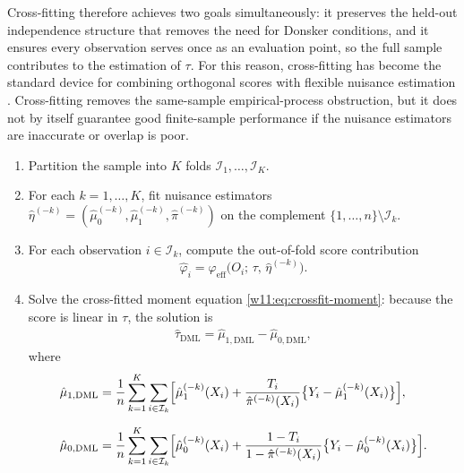 \documentclass[master.tex]{subfiles}
\begin{document}
Cross-fitting therefore achieves two goals simultaneously: it
preserves the held-out independence structure that removes the need
for Donsker conditions, and it ensures every observation serves
once as an evaluation point, so the full sample contributes to the
estimation of $\tau$.  For this reason, cross-fitting has become
the standard device for combining orthogonal scores with flexible
nuisance estimation \citep{chernozhukov2018double,vanderLaan2011targeted}.
Cross-fitting removes the same-sample empirical-process obstruction,
but it does not by itself guarantee good finite-sample performance
if the nuisance estimators are inaccurate or overlap is poor.

\begin{tcolorbox}[defstyle,
  title={Algorithm: Cross-Fitted Orthogonal-Score Estimator for the ATE}]
\label{w11:alg:crossfit}
\begin{enumerate}
  \item Partition the sample into $K$ folds
    $\mathcal{I}_1,\ldots,\mathcal{I}_K$.
  \item For each $k = 1,\ldots,K$, fit nuisance estimators
    $\hat\eta^{(-k)} = (\hat\mu_0^{(-k)}, \hat\mu_1^{(-k)},
    \hat\pi^{(-k)})$ on the complement
    $\{1,\ldots,n\} \setminus \mathcal{I}_k$.
  \item For each observation $i \in \mathcal{I}_k$, compute the
    out-of-fold score contribution
    \[
      \hat\varphi_i
      =
      \varphi_{\mathrm{eff}}\!\bigl(O_i;\,\tau,\,\hat\eta^{(-k)}\bigr).
    \]
  \item Solve the cross-fitted moment equation
    \eqref{w11:eq:crossfit-moment}: because the score is linear
    in $\tau$, the solution is
    \begin{align}
      \hat\tau_{\mathrm{DML}} = \hat\mu_{1,\mathrm{DML}} - \hat\mu_{0,\mathrm{DML}},
      \label{w11:eq:dml-ate}
    \end{align}
    where
    \begin{align*}
      \hat\mu_{1,\mathrm{DML}}
      &=
      \frac{1}{n}\sum_{k=1}^{K}\sum_{i\in\mathcal{I}_k}
      \Bigl[
        \hat\mu_1^{(-k)}(X_i)
        +
        \frac{T_i}{\hat\pi^{(-k)}(X_i)}
        \bigl\{Y_i - \hat\mu_1^{(-k)}(X_i)\bigr\}
      \Bigr], \\[6pt]
      \hat\mu_{0,\mathrm{DML}}
      &=
      \frac{1}{n}\sum_{k=1}^{K}\sum_{i\in\mathcal{I}_k}
      \Bigl[
        \hat\mu_0^{(-k)}(X_i)
        +
        \frac{1-T_i}{1-\hat\pi^{(-k)}(X_i)}
        \bigl\{Y_i - \hat\mu_0^{(-k)}(X_i)\bigr\}
      \Bigr].
    \end{align*}
\end{enumerate}
\end{tcolorbox}
\end{document}
